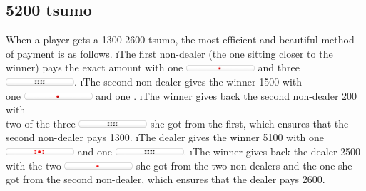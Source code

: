 \subsection*{5200 {\jap tsumo}}
When a player gets a 1300-2600 {\jap tsumo}, the most efficient and beautiful method of payment is as follows.
\be
\i The first non-dealer (the one sitting closer to the winner) pays the exact amount with one \includegraphics[width=1in]{figs/tenbou1000} and three \includegraphics[width=1in]{figs/tenbou100}.
\i The second non-dealer gives the winner 1500 with\\
one \includegraphics[width=1in]{figs/tenbou1000} and one .
\i The winner gives back the second non-dealer 200 with\\
two of the three \includegraphics[width=1in]{figs/tenbou100} she got from the first,
which ensures that the second non-dealer pays 1300.
\i The dealer gives the winner 5100 with one \includegraphics[width=1in]{figs/tenbou5000} and one \includegraphics[width=1in]{figs/tenbou100}.
\i The winner gives back the dealer 2500 with the two \includegraphics[width=1in]{figs/tenbou1000} she got from the two non-dealers and the one  she got from the second non-dealer, which ensures that the dealer pays 2600.
